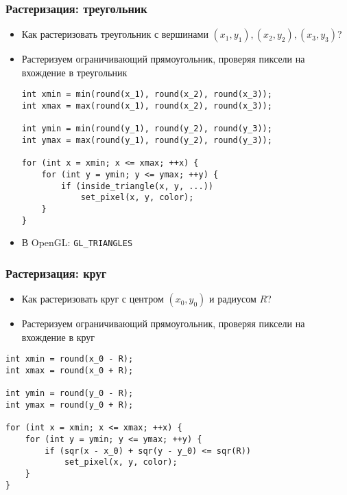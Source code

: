 \documentclass{beamer}
\begin{document}
\begin{frame}[fragile]
\frametitle{Растеризация: треугольник}
\begin{itemize}
\item Как растеризовать треугольник с вершинами \begin{math}(x_1, y_1), (x_2, y_2), (x_3, y_3)\end{math}?
\pause
\item Растеризуем ограничивающий прямоугольник, проверяя пиксели на вхождение в треугольник
\pause
\begin{verbatim}
int xmin = min(round(x_1), round(x_2), round(x_3));
int xmax = max(round(x_1), round(x_2), round(x_3));

int ymin = min(round(y_1), round(y_2), round(y_3));
int ymax = max(round(y_1), round(y_2), round(y_3));

for (int x = xmin; x <= xmax; ++x) {
    for (int y = ymin; y <= ymax; ++y) {
        if (inside_triangle(x, y, ...))
            set_pixel(x, y, color);
    }
}
\end{verbatim}
\pause
\item В OpenGL: \verb|GL_TRIANGLES|
\end{itemize}
\end{frame}

\begin{frame}[fragile]
\frametitle{Растеризация: круг}
\begin{itemize}
\item Как растеризовать круг с центром \begin{math}(x_0, y_0)\end{math} и радиусом \begin{math}R\end{math}?
\pause
\item Растеризуем ограничивающий прямоугольник, проверяя пиксели на вхождение в круг
\end{itemize}
\pause
\begin{verbatim}
int xmin = round(x_0 - R);
int xmax = round(x_0 + R);

int ymin = round(y_0 - R);
int ymax = round(y_0 + R);

for (int x = xmin; x <= xmax; ++x) {
    for (int y = ymin; y <= ymax; ++y) {
        if (sqr(x - x_0) + sqr(y - y_0) <= sqr(R))
            set_pixel(x, y, color);
    }
}
\end{verbatim}
\end{frame}
\end{document}
